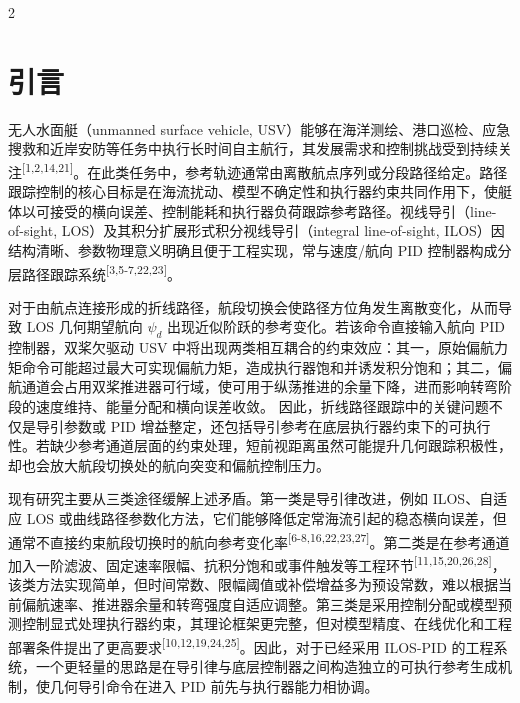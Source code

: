 \documentclass[authordraft]{ctacn}
\begin{document}

\maketitle

\begin{multicols}{2}

\section{引\quad 言}

无人水面艇（unmanned surface vehicle, USV）能够在海洋测绘、港口巡检、应急搜救和近岸安防等任务中执行长时间自主航行，其发展需求和控制挑战受到持续关注\textsuperscript{[1,2,14,21]}。在此类任务中，参考轨迹通常由离散航点序列或分段路径给定。路径跟踪控制的核心目标是在海流扰动、模型不确定性和执行器约束共同作用下，使艇体以可接受的横向误差、控制能耗和执行器负荷跟踪参考路径。视线导引（line-of-sight, LOS）及其积分扩展形式积分视线导引（integral line-of-sight, ILOS）因结构清晰、参数物理意义明确且便于工程实现，常与速度/航向 PID 控制器构成分层路径跟踪系统\textsuperscript{[3,5-7,22,23]}。

对于由航点连接形成的折线路径，航段切换会使路径方位角发生离散变化，从而导致 LOS 几何期望航向 $\psi_d$ 出现近似阶跃的参考变化。若该命令直接输入航向 PID 控制器，双桨欠驱动 USV 中将出现两类相互耦合的约束效应：其一，原始偏航力矩命令可能超过最大可实现偏航力矩，造成执行器饱和并诱发积分饱和；其二，偏航通道会占用双桨推进器可行域，使可用于纵荡推进的余量下降，进而影响转弯阶段的速度维持、能量分配和横向误差收敛。
因此，折线路径跟踪中的关键问题不仅是导引参数或 PID 增益整定，还包括导引参考在底层执行器约束下的可执行性。若缺少参考通道层面的约束处理，短前视距离虽然可能提升几何跟踪积极性，却也会放大航段切换处的航向突变和偏航控制压力。

现有研究主要从三类途径缓解上述矛盾。第一类是导引律改进，例如 ILOS、自适应 LOS 或曲线路径参数化方法，它们能够降低定常海流引起的稳态横向误差，但通常不直接约束航段切换时的航向参考变化率\textsuperscript{[6-8,16,22,23,27]}。第二类是在参考通道加入一阶滤波、固定速率限幅、抗积分饱和或事件触发等工程环节\textsuperscript{[11,15,20,26,28]}，该类方法实现简单，但时间常数、限幅阈值或补偿增益多为预设常数，难以根据当前偏航速率、推进器余量和转弯强度自适应调整。第三类是采用控制分配或模型预测控制显式处理执行器约束，其理论框架更完整，但对模型精度、在线优化和工程部署条件提出了更高要求\textsuperscript{[10,12,19,24,25]}。因此，对于已经采用 ILOS-PID 的工程系统，一个更轻量的思路是在导引律与底层控制器之间构造独立的可执行参考生成机制，使几何导引命令在进入 PID 前先与执行器能力相协调。


\end{multicols}
\end{document}
